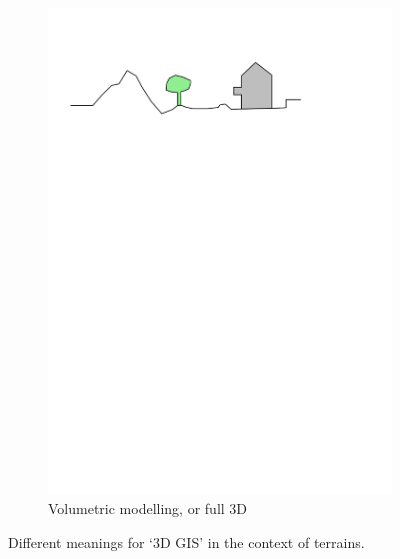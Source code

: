 \begin{figure}[b]
\begin{subfigure}[b]{0.45\linewidth}
    \includegraphics[page=4,width=\linewidth]{figs/dimgis}
    \caption{Volumetric modelling, or full 3D}\label{fig:dimgis:3}
  \end{subfigure}%
  \caption{Different meanings for `3D GIS' in the context of terrains.}
\label{fig:dimgis}
\end{figure}

